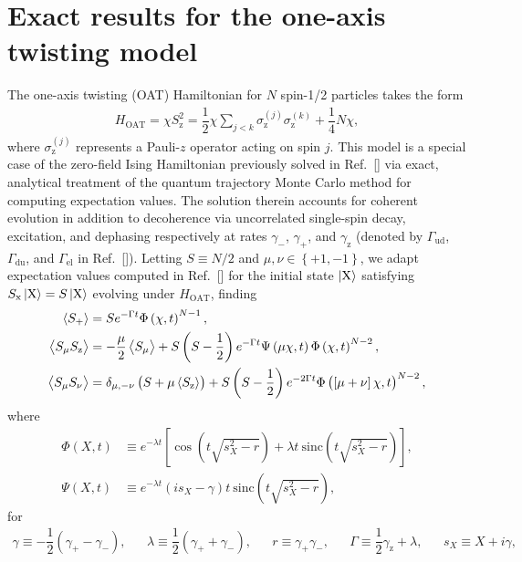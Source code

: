 \documentclass[pra,reprint,longbibliography]{revtex4-1}
\renewcommand{\t}{\text} %
\newcommand{\f}[2]{\dfrac{#1}{#2}} %
\newcommand{\p}[1]{\left(#1\right)} %
\renewcommand{\sp}[1]{\left[#1\right]} %
\renewcommand{\set}[1]{\left\{#1\right\}} %
\newcommand{\bk}{\Braket} %
\newcommand{\z}{\text{z}}
\newcommand{\x}{\text{x}}
\newcommand{\X}{\text{X}}
\newcommand{\1}{\mathds{1}}
\begin{document}
\section{Exact results for the one-axis twisting model}
\label{sec:OAT}

The one-axis twisting (OAT) Hamiltonian for $N$ spin-1/2 particles
takes the form
\begin{align}
  H_{\t{OAT}}
  = \chi S_\z^2
  = \f12 \chi \sum_{j<k} \sigma_\z^{(j)} \sigma_\z^{(k)} + \f14 N \chi,
\end{align}
where $\sigma_\z^{(j)}$ represents a Pauli-$z$ operator acting on spin
$j$.  This model is a special case of the zero-field Ising Hamiltonian
previously solved in Ref.~[] via
exact, analytical treatment of the quantum trajectory Monte Carlo
method for computing expectation values.  The solution therein
accounts for coherent evolution in addition to decoherence via
uncorrelated single-spin decay, excitation, and dephasing respectively
at rates $\gamma_-$, $\gamma_+$, and $\gamma_\z$ (denoted by
$\Gamma_{\t{ud}}$, $\Gamma_{\t{du}}$, and $\Gamma_{\t{el}}$ in
Ref.~[]).  Letting $S\equiv N/2$
and $\mu,\nu\in\set{+1,-1}$, we adapt expectation values computed in
Ref.~[] for the initial state
$\ket{\X}$ satisfying $S_\x\ket{\X}=S\ket{\X}$ evolving under
$H_{\t{OAT}}$, finding
\begin{align}
  \bk{S_+}
  &= S e^{-\Gamma t} \Phi\p{\chi,t}^{N-1}, \label{eq:S+_OAT} \\
  \bk{S_\mu S_\z}
  &= -\f{\mu}{2}\bk{S_\mu} + S \p{S-\f12} e^{-\Gamma t}
  \Psi\p{\mu\chi,t} \Phi\p{\chi,t}^{N-2}, \\
  \bk{S_\mu S_\nu}
  &= \delta_{\mu,-\nu} \p{S + \mu\bk{S_\z}}
  + S \p{S-\f12} e^{-2\Gamma t}
  \Phi\p{\sp{\mu+\nu}\chi,t}^{N-2}, \label{eq:SS+-_OAT}
\end{align}
where
\begin{align}
  \Phi\p{X,t}
  &\equiv e^{-\lambda t} \sp{\cos\p{t\sqrt{s_X^2-r}}
    + \lambda t~\t{sinc}\p{t\sqrt{s_X^2-r}}},
  \\
  \Psi\p{X,t}
  &\equiv e^{-\lambda t} \p{is_X-\gamma}t~
  \t{sinc}\p{t\sqrt{s_X^2-r}},
\end{align}
for
\begin{align}
  \gamma \equiv -\f12 \p{\gamma_+ - \gamma_-},
  &&
  \lambda \equiv \f12 \p{\gamma_+ + \gamma_-},
  &&
  r \equiv \gamma_+ \gamma_-,
  &&
  \Gamma \equiv \f12\gamma_\z + \lambda,
  &&
  s_X \equiv X + i\gamma,
\end{align}
\end{document}
